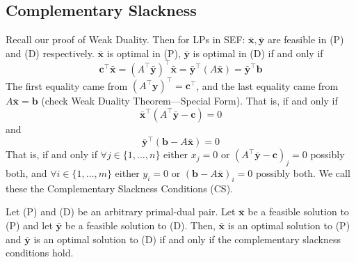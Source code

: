 \subsection{Complementary Slackness}
Recall our proof of Weak Duality. Then for LPs in SEF\@:
$ \bm{\bar{x}}, \bm{\bar{y}} $ are feasible in (P) and (D) respectively.
$ \bm{\bar{x}} $ is optimal in (P), $ \bm{\bar{y}} $ is optimal in
(D)  if and only if
\[ \bm{c} ^\top \bm{\bar{x}}=(A^\top \bm{\bar{y}})^\top \bm{\bar{x}}=\bm{\bar{y}}^\top(A \bm{\bar{x}})=
    \bm{\bar{y}}^\top \bm{b} \]
The first equality came from $ (A ^\top \bm{y})^\top=\bm{c}^\top $, and the
last equality came from $ A \bm{\bar{x}}=\bm{b} $ (check Weak Duality Theorem---Special Form).
That is, if and only if
\[ \bm{\bar{x}}^\top(A ^\top \bm{\bar{y}}-\bm{c})=0 \]
and
\[ \bm{\bar{y}}^\top(\bm{b}-A \bm{\bar{x}})=0 \]
That is, if and only if $ \forall j\in \{1,\ldots,n\} $ either
$ x_j=0 $ or $ (A ^\top \bm{\bar{y}}-\bm{c})_j=0 $ possibly
both, and $ \forall i\in \{1,\ldots,m\} $ either $ y_i=0 $
or $ (\bm{b}-A \bm{\bar{x}})_i=0 $ possibly both. We call these
the Complementary Slackness Conditions (CS).

\begin{thmbox}
    \begin{theorem}
        Let (P) and (D) be an arbitrary primal-dual pair. Let
        $ \bm{\bar{x}} $ be a feasible solution to (P) and let
        $ \bm{\bar{y}} $ be a feasible solution to (D). Then,
        $ \bm{\bar{x}} $ is an optimal solution to (P) and
        $ \bm{\bar{y}} $ is an optimal solution to (D) if and only if
        the complementary slackness conditions hold.
    \end{theorem}
\end{thmbox}

